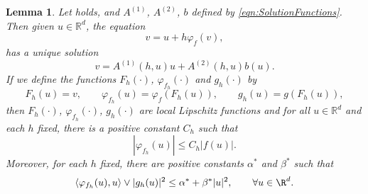 \documentclass[sort&compress, preprint]{elsarticle}
\theoremstyle{definition}
\theoremstyle{plain}%
\newtheorem{lem}{Lemma}[section]
\theoremstyle{remark}
\newcommand{\innerprod}[2]{\left\langle#1, #2\right\rangle}
\begin{document}
%
\begin{lem}\label{lem:PhiFhProp}
	Let  holds, and $A^{(1)}$, $A^{(2)}$, $b$  
	defined by 
	\eqref{eqn:SolutionFunctions}. Then given $u\in\mathbb{R}^d$, the equation
	\begin{equation}\label{eqn:varphiEquation}
		v = u + h \varphi_f(v),
	\end{equation}
	has a unique solution 
	\begin{equation}\label{eqn:varphiEqnSolution}
		v = A^{(1)}(h,u)u +A^{(2)}(h,u) b(u)	.
	\end{equation}
%
	If we define the functions
	$F_h(\cdot)$, $\varphi_{f_h}(\cdot)$ and $g_h(\cdot)$ by
	\begin{equation}\label{eqn:FunctionshDefinition}
		F_h(u) = v,
			\qquad 
			\varphi_{f_h}(u) =\varphi_{f}(F_h(u)),
			\qquad
			g_h(u) = g(F_h(u)),
	\end{equation}
	then $F_h(\cdot)$, $\varphi_{f_h}(\cdot)$, $g_h(\cdot)$ are local Lipschitz functions 
	and for all $u\in \mathbb{R}^d$ and each $h$ fixed, there is a positive constant $C_h$ such that
	\begin{equation}\label{eqn:PhifhFbound}
		|\varphi_{f_h}(u)|\leq C_h |f(u)|. 
	\end{equation} 
	Moreover, for each $h$ fixed,
	 there are positive constants $\alpha^*$ and  $\beta^*$ such that
	\begin{equation}\label{eqn:h-MonotoneCondition}
		\innerprod{\varphi_{f_h}(u)}{u} \vee |g_h(u)|^2 \leq \alpha^* + \beta^* |u|^2, 
		\qquad
		\forall u \in \R^d.
	\end{equation}
\end{lem}
%
\end{document}
